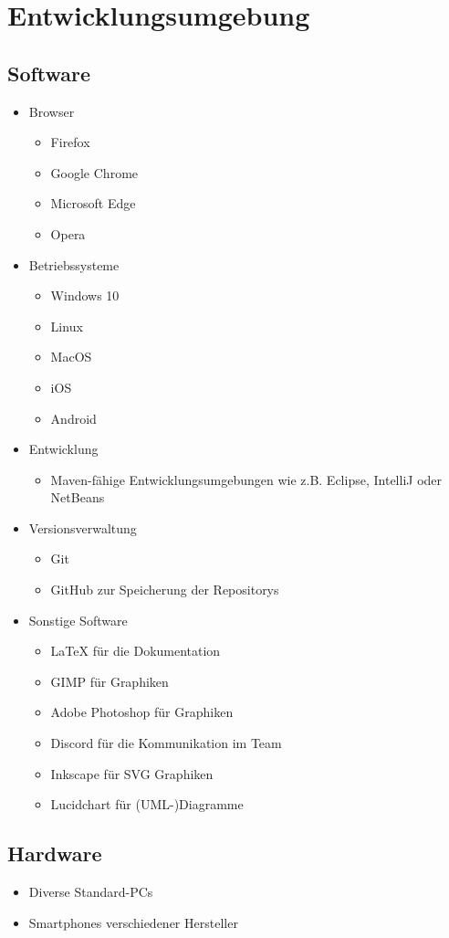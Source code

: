 \section{Entwicklungsumgebung}
\subsection{Software}
\begin{itemize}
    \item Browser
    \begin{itemize} [noitemsep]
        \item Firefox
        \item Google Chrome
        \item Microsoft Edge
        \item Opera
    \end{itemize} 
    \item Betriebssysteme
    \begin{itemize} [noitemsep]
        \item Windows 10
        \item Linux
        \item MacOS
        \item iOS
        \item Android
    \end{itemize}
    \item Entwicklung
    \begin{itemize} [noitemsep]
        \item \gls{Maven}-fähige Entwicklungsumgebungen wie z.B. \gls{Eclipse}, \gls{IntelliJ} oder \gls{NetBeans}
    \end{itemize}
    \item Versionsverwaltung
    \begin{itemize} [noitemsep]
        \item \gls{Git}
        \item \gls{GitHub} zur Speicherung der \glspl{Repository}
    \end{itemize}
    \item Sonstige Software
    \begin{itemize} [noitemsep]
        \item \LaTeX \hspace{0.05cm} für die Dokumentation
        \item GIMP für Graphiken
        \item Adobe Photoshop für Graphiken
        \item Discord für die Kommunikation im Team
        \item Inkscape für SVG Graphiken
        \item Lucidchart für (\gls{UML}-)Diagramme
    \end{itemize}
\end{itemize}
\subsection{Hardware}
\begin{itemize} [noitemsep]
    \item Diverse \glspl{Standard-PC}
    \item \glspl{Smartphone} verschiedener Hersteller
\end{itemize}
